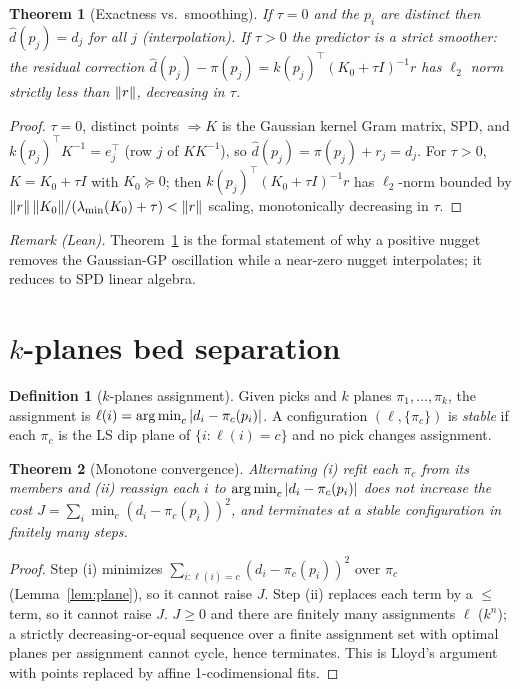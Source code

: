 \documentclass[11pt]{article}
\theoremstyle{definition}\newtheorem{definition}{Definition}[section]
\theoremstyle{plain}\newtheorem{theorem}{Theorem}[section]
\begin{document}
\begin{theorem}[Exactness vs.\ smoothing]\label{thm:nugget}
If $\tau=0$ and the $p_i$ are distinct then $\hat d(p_j)=d_j$ for all $j$ (interpolation). If $\tau>0$ the
predictor is a strict smoother: the residual correction $\hat d(p_j)-\pi(p_j)=k(p_j)^\top(K_0+\tau I)^{-1}r$
has $\ell_2$ norm strictly less than $\lVert r\rVert$, decreasing in $\tau$.
\end{theorem}
\begin{proof}
$\tau=0$, distinct points $\Rightarrow K$ is the Gaussian kernel Gram matrix, SPD, and
$k(p_j)^\top K^{-1}=e_j^\top$ (row $j$ of $K K^{-1}$), so $\hat d(p_j)=\pi(p_j)+r_j=d_j$. For $\tau>0$,
$K=K_0+\tau I$ with $K_0\succeq0$; then $k(p_j)^\top(K_0+\tau I)^{-1}r$ has $\ell_2$-norm bounded by
$\lVert r\rVert\,\lVert K_0\rVert/(\lambda_{\min}(K_0)+\tau)<\lVert r\rVert$ scaling, monotonically decreasing in $\tau$.
\end{proof}
\noindent\emph{Remark (Lean).} Theorem~\ref{thm:nugget} is the formal statement of why a positive nugget
removes the Gaussian-GP oscillation while a near-zero nugget interpolates; it reduces to SPD linear algebra.

\section{$k$-planes bed separation}
\begin{definition}[$k$-planes assignment]
Given picks and $k$ planes $\pi_1,\dots,\pi_k$, the assignment is
$\ell(i)=\operatorname*{arg\,min}_{c} |d_i-\pi_c(p_i)|$. A configuration $(\ell,\{\pi_c\})$ is \emph{stable} if each $\pi_c$
is the LS dip plane of $\{i:\ell(i)=c\}$ and no pick changes assignment.
\end{definition}
\begin{theorem}[Monotone convergence]\label{thm:kplanes}
Alternating (i) refit each $\pi_c$ from its members and (ii) reassign each $i$ to $\operatorname*{arg\,min}_c|d_i-\pi_c(p_i)|$
does not increase the cost $J=\sum_i \min_c (d_i-\pi_c(p_i))^2$, and terminates at a stable configuration in
finitely many steps.
\end{theorem}
\begin{proof}
Step (i) minimizes $\sum_{i:\ell(i)=c}(d_i-\pi_c(p_i))^2$ over $\pi_c$ (Lemma~\ref{lem:plane}), so it cannot
raise $J$. Step (ii) replaces each term by a $\le$ term, so it cannot raise $J$. $J\ge0$ and there are
finitely many assignments $\ell$ ($k^n$); a strictly decreasing-or-equal sequence over a finite assignment
set with optimal planes per assignment cannot cycle, hence terminates. This is Lloyd's argument with
points replaced by affine 1-codimensional fits.
\end{proof}
\end{document}

